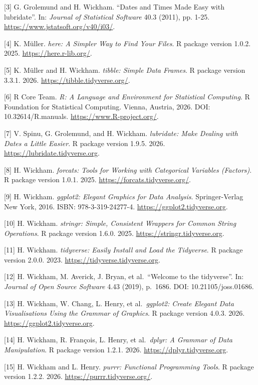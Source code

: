 \documentclass[
  letterpaper,
  DIV=11,
  numbers=noendperiod]{scrartcl}
\begin{document}
{[}3{]} G. Grolemund and H. Wickham. ``Dates and Times Made Easy with
lubridate''. In: \emph{Journal of Statistical Software} 40.3 (2011), pp.
1-25. \url{https://www.jstatsoft.org/v40/i03/}.

{[}4{]} K. Müller. \emph{here: A Simpler Way to Find Your Files}. R
package version 1.0.2. 2025. \url{https://here.r-lib.org/}.

{[}5{]} K. Müller and H. Wickham. \emph{tibble: Simple Data Frames}. R
package version 3.3.1. 2026. \url{https://tibble.tidyverse.org/}.

{[}6{]} R Core Team. \emph{R: A Language and Environment for Statistical
Computing}. R Foundation for Statistical Computing. Vienna, Austria,
2026. DOI: 10.32614/R.manuals. \url{https://www.R-project.org/}.

{[}7{]} V. Spinu, G. Grolemund, and H. Wickham. \emph{lubridate: Make
Dealing with Dates a Little Easier}. R package version 1.9.5. 2026.
\url{https://lubridate.tidyverse.org}.

{[}8{]} H. Wickham. \emph{forcats: Tools for Working with Categorical
Variables (Factors)}. R package version 1.0.1. 2025.
\url{https://forcats.tidyverse.org/}.

{[}9{]} H. Wickham. \emph{ggplot2: Elegant Graphics for Data Analysis}.
Springer-Verlag New York, 2016. ISBN: 978-3-319-24277-4.
\url{https://ggplot2.tidyverse.org}.

{[}10{]} H. Wickham. \emph{stringr: Simple, Consistent Wrappers for
Common String Operations}. R package version 1.6.0. 2025.
\url{https://stringr.tidyverse.org}.

{[}11{]} H. Wickham. \emph{tidyverse: Easily Install and Load the
Tidyverse}. R package version 2.0.0. 2023.
\url{https://tidyverse.tidyverse.org}.

{[}12{]} H. Wickham, M. Averick, J. Bryan, et al.~``Welcome to the
tidyverse''. In: \emph{Journal of Open Source Software} 4.43 (2019),
p.~1686. DOI: 10.21105/joss.01686.

{[}13{]} H. Wickham, W. Chang, L. Henry, et al.~\emph{ggplot2: Create
Elegant Data Visualisations Using the Grammar of Graphics}. R package
version 4.0.3. 2026. \url{https://ggplot2.tidyverse.org}.

{[}14{]} H. Wickham, R. François, L. Henry, et al.~\emph{dplyr: A
Grammar of Data Manipulation}. R package version 1.2.1. 2026.
\url{https://dplyr.tidyverse.org}.

{[}15{]} H. Wickham and L. Henry. \emph{purrr: Functional Programming
Tools}. R package version 1.2.2. 2026.
\url{https://purrr.tidyverse.org/}.
\end{document}
